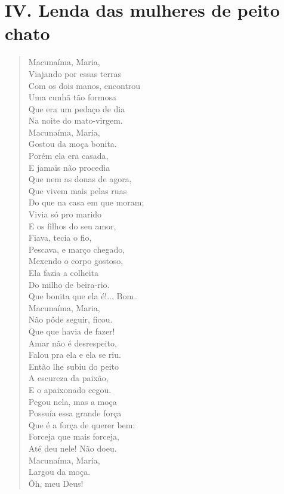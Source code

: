 \pagebreak
\section{IV. Lenda das mulheres de peito chato}

\begin{verse}
Macunaíma, Maria,\\
Viajando por essas terras\\
Com os dois manos, encontrou\\
Uma cunhã tão formosa\\
Que era um pedaço de dia\\
Na noite do mato-virgem.\\
Macunaíma, Maria,\\
Gostou da moça bonita.\\
Porém ela era casada,\\
E jamais não procedia\\
Que nem as donas de agora,\\
Que vivem mais pelas ruas\\
Do que na casa em que moram;\\
Vivia só pro marido\\
E os filhos do seu amor,\\
Fiava, tecia o fio,\\
Pescava, e março chegado,\\
Mexendo o corpo gostoso,\\
Ela fazia a colheita\\
Do milho de beira-rio.\\
Que bonita que ela é!... Bom.\\
Macunaíma, Maria,\\
Não pôde seguir, ficou.\\
Que que havia de fazer!\\
Amar não é desrespeito,\\
Falou pra ela e ela se riu.\\
Então lhe subiu do peito\\
A escureza da paixão,\\
E o apaixonado cegou.\\
Pegou nela, mas a moça\\
Possuía essa grande força\\
Que é a força de querer bem:\\
Forceja que mais forceja,\\
Até deu nele! Não doeu.\\
Macunaíma, Maria,\\
Largou da moça.\\
\quad\quad\quad{}Ôh, meu Deus!


\end{verse}

